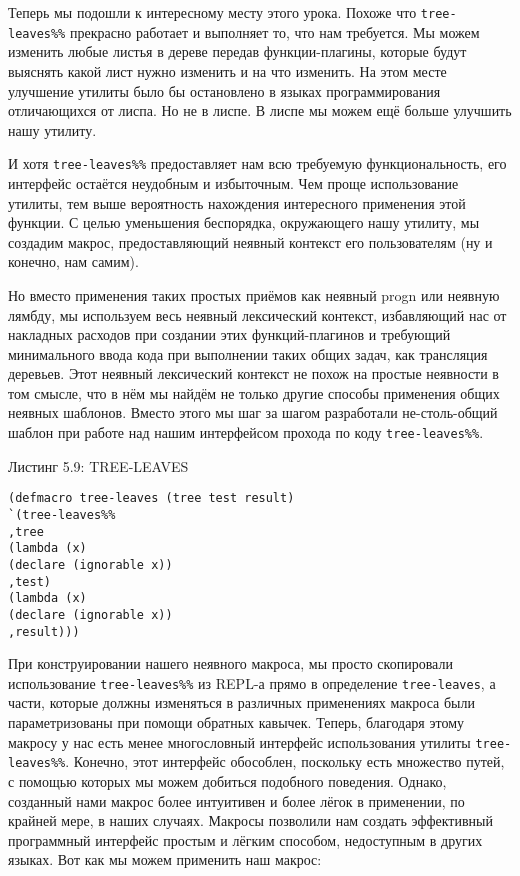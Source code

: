 Теперь мы подошли к интересному месту этого урока. Похоже что \verb"tree-leaves%%" прекрасно работает и выполняет то, что нам требуется. Мы можем изменить любые листья в дереве передав функции-плагины, которые будут выяснять какой лист нужно изменить и на что изменить. На этом месте улучшение утилиты было бы остановлено в языках программирования отличающихся от лиспа. Но не в лиспе. В лиспе мы можем ещё больше улучшить нашу утилиту.

И хотя \verb"tree-leaves%%" предоставляет нам всю требуемую функциональность, его интерфейс остаётся неудобным и избыточным. Чем проще использование утилиты, тем выше вероятность нахождения интересного применения этой функции. С целью уменьшения беспорядка, окружающего нашу утилиту, мы создадим макрос, предоставляющий неявный контекст его пользователям (ну и конечно, нам самим).

Но вместо применения таких простых приёмов как неявный progn или неявную лямбду, мы используем весь неявный лексический контекст, избавляющий нас от накладных расходов при создании этих функций-плагинов и требующий минимального ввода кода при выполнении таких общих задач, как трансляция деревьев. Этот неявный лексический контекст не похож на простые неявности в том смысле, что в нём мы найдём не только другие способы применения общих неявных шаблонов. Вместо этого мы шаг за шагом разработали не-столь-общий шаблон при работе над нашим интерфейсом прохода по коду \verb"tree-leaves%%".

Листинг 5.9: TREE-LEAVES\label{listing_5.9}
\listbegin
\begin{verbatim}
(defmacro tree-leaves (tree test result)
`(tree-leaves%%
,tree
(lambda (x)
(declare (ignorable x))
,test)
(lambda (x)
(declare (ignorable x))
,result)))
\end{verbatim}
\listend

При конструировании нашего неявного макроса, мы просто скопировали использование \verb"tree-leaves%%" из REPL-а прямо в определение \verb"tree-leaves", а части, которые должны изменяться в различных применениях макроса были параметризованы при помощи обратных кавычек. Теперь, благодаря этому макросу у нас есть менее многословный интерфейс использования утилиты \verb"tree-leaves%%". Конечно, этот интерфейс обособлен, поскольку есть множество путей, с помощью которых мы можем добиться подобного поведения. Однако, созданный нами макрос более интуитивен и более лёгок в применении, по крайней мере, в наших случаях. Макросы позволили нам создать эффективный программный интерфейс простым и лёгким способом, недоступным в других языках. Вот как мы можем применить наш макрос:

